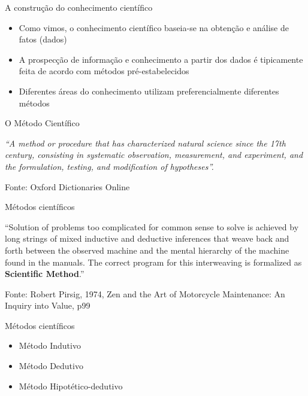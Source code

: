 \documentclass{beamer}
\begin{document}
\begin{frame}{A construção do conhecimento científico}
  \begin{itemize}
  \item Como vimos, o conhecimento científico baseia-se na obtenção e
    análise de fatos (dados)
  \item A prospecção de informação e conhecimento a partir dos dados é
    tipicamente feita de acordo com métodos pré-estabelecidos
  \item Diferentes áreas do conhecimento utilizam preferencialmente
    diferentes métodos
  \end{itemize}
\end{frame}

\begin{frame}{O Método Científico}
  \begin{block}{}
    {\em ``A method or procedure that has characterized natural science since the 17th century, consisting in systematic observation, measurement, and experiment, and the formulation, testing, and modification of hypotheses''.}
  \end{block}

  \vfill
  Fonte: Oxford Dictionaries Online
\end{frame}

\begin{frame}{Métodos científicos}
  \begin{block}{}
    ``Solution of problems too complicated for common sense to solve
    is achieved by long strings of mixed \alert{inductive} and
    \alert{deductive} inferences that weave back and forth between the
    observed machine and the mental hierarchy of the machine found in
    the manuals. The correct program for this interweaving is
    formalized as {\bf Scientific Method}.''
  \end{block}

\vfill
  Fonte: Robert Pirsig, 1974, Zen and the Art of Motorcycle
  Maintenance: An Inquiry into Value, p99
\end{frame}

\begin{frame}{Métodos científicos}
  \begin{itemize}
  \item Método Indutivo
  \item Método Dedutivo
  \item Método Hipotético-dedutivo
  \end{itemize}
\end{frame}
\end{document}
